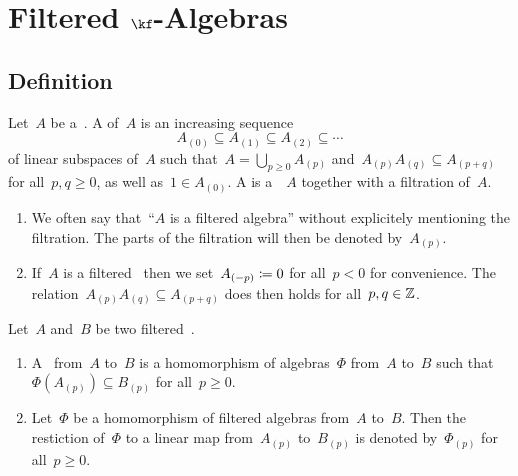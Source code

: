 \section{Filtered \texorpdfstring{$\kf$}{k}-Algebras}



\subsection{Definition}

\begin{definition}
  Let~$A$ be a~\algebra{$\kf$}.
  A  of~$A$ is an increasing sequence
  \[
    A_{(0)}
    \subseteq
    A_{(1)}
    \subseteq
    A_{(2)}
    \subseteq
    \dotsb
  \]
  of linear subspaces of~$A$ such that~$A = \bigcup_{p \geq 0} A_{(p)}$ and~$A_{(p)} A_{(q)} \subseteq A_{(p+q)}$ for all~$p, q \geq 0$, as well as~$1 \in A_{(0)}$.
  A  is a~\algebra{$\kf$}~$A$ together with a filtration of~$A$.
\end{definition}


\begin{remark}
  \label{filtration conventions}
  \leavevmode
  \begin{enumerate}
    \item
      We often say that~\enquote{$A$ is a filtered algebra} without explicitely mentioning the filtration.
      The parts of the filtration will then be denoted by~$A_{(p)}$.
    \item
      If~$A$ is a filtered~{\algebra{$\kf$}} then we set~$A_{(-p)} \coloneqq 0$ for all~$p < 0$ for convenience.
      The relation~$A_{(p)} A_{(q)} \subseteq A_{(p+q)}$ does then holds for all~$p, q \in \mathbb{Z}$.
  \end{enumerate}
\end{remark}


\begin{definition}
  Let~$A$ and~$B$ be two filtered~\algebras{$\kf$}.
  \begin{enumerate}
    \item
      A~ from~$A$ to~$B$ is a homomorphism of algebras~$\Phi$ from~$A$ to~$B$ such that~$\Phi( A_{(p)} ) \subseteq B_{(p)}$ for all~$p \geq 0$.
    \item
      Let~$\Phi$ be a homomorphism of filtered algebras from~$A$ to~$B$.
      Then the restiction of~$\Phi$ to a linear map from~$A_{(p)}$ to~$B_{(p)}$ is denoted by~$\Phi_{(p)}$ for all~$p \geq 0$.
  \end{enumerate}
\end{definition}


